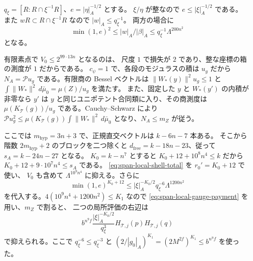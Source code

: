 \(q_\xi=[R:R\cap\xi^{-1}R]\)、\(e=|\eta|_A^{-1/2}\) とする。
\(\xi/\eta\) が整なので \(e\le|\xi|_A^{-1/2}\) である。
また \(wR\subset R\cap\xi^{-1}R\) なので \(|w|_A\le q_\xi^{-1}\)。
両方の場合に
\[
 \min(1,e)^2\le |w|_A/|\beta|_A
               \le q_\xi^{-1}\Lambda^{200n^2}
\]
となる。

有限素点で \(V_0\le2^{99\cdot13n}\) となるのは、
尺度 \(1\) で損失が \(2\) であり、整な座標の箱の測度が \(1\) だからである。
\(c_\psi=1\) で、各段のモジュラスの積は \(u_g\) だから
\(N_A=\mathcal P u_g\) である。有限商の Bessel ベクトルは
\(\|W_\ast(y)\|^2u_g\le1\) と
\(\int\|W_\ast\|^2\,d\bar\mu_0=\mu(Z)/u_g\) を満たす。
また、固定した \(y\) と \(W_\ast(y')\) の内積が非零なら \(y'\) は
\(y\) と同じユニポテント合同類に入り、その商測度は
\(\mu(K_{\mathcal T}(g))/u_g\) である。Cauchy--Schwarz により
\(\mathcal P u_g^2\le\mu(K_{\mathcal T}(g))\int\|W_\ast\|^2\,d\bar\mu_0\)
となり、\(N_A\le m_Z\) が従う。

ここでは \(m_\mathrm{hyp}=3n+3\) で、正規直交ベクトルは \(k-6n-7\) 本ある。
そこから階数 \(2m_\mathrm{hyp}+2\) のブロックを二つ除くと
\(d_{\mathrm{free}}=k-18n-23\)、従って \(s_A=k-24n-27\) となる。
\(K_0=k-n^7\) とすると \(K_0+12+10^8n^4\le k\) だから
\(K_0+12+9\cdot10^7n^4\le s_A\) である。
\eqref{eq:span-local-shell-total} を \(r_0'=K_0+12\) で使い、
\(V_0\) も含めて \(\Lambda^{10^9n^4}\) に抑える。さらに
\[
 \min(1,e)^{K_0+12}\le
   |\xi|_A^{-K_0/2}q_\xi^{-6}\Lambda^{1200n^2}
\]
を代入する。\(4(10^9n^4+1200n^2)\le K_1\) なので
\eqref{eq:span-local-gauge-payment} を用い、\(m_Z\) で割ると、
二つの局所評価の右辺は
\begin{equation}\label{eq:span-finite-decay}
 b^{n^9f}\frac{|\xi|_A^{-K_0/2}}{q_\xi^3}
            H_{\mathcal T,j}(p)H_{\mathcal T,j}(q)
\end{equation}
で抑えられる。ここで \(q_\xi^{-6}\le q_\xi^{-3}\) と
\((2/|g_0|_A)^{K_1}=(2M^{2f})^{K_1}\le b^{n^9f}\) を使った。

